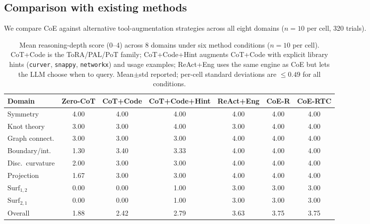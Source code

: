 \documentclass{article}
\begin{document}
\enlargethispage{14\baselineskip}
\subsection{Comparison with existing methods}
\label{sec:comparison}
We compare CoE against alternative tool-augmentation strategies across all
eight domains ($n{=}10$ per cell, 320 trials).

\begin{table}[t]
\centering
\caption{Mean reasoning-depth score (0--4) across 8 domains under six method
conditions ($n{=}10$ per cell). CoT+Code is the ToRA/PAL/PoT family;
CoT+Code+Hint augments CoT+Code with explicit library hints
(\texttt{curver}, \texttt{snappy}, \texttt{networkx}) and usage examples;
ReAct+Eng uses the same engine as CoE but lets the LLM choose when to query.
Mean$\pm$std reported; per-cell standard deviations are $\le 0.49$ for all conditions.}
\label{tab:methods}
\scriptsize
\setlength{\tabcolsep}{3pt}
\begin{tabular}{lcccccc}
\toprule
Domain & Zero-CoT & CoT+Code & CoT+Code+Hint & ReAct+Eng & CoE-R & CoE-RTC \\
\midrule
Symmetry              & 4.00 & 4.00 & 4.00 & 4.00 & 4.00 & 4.00 \\
Knot theory           & 3.00 & 3.00 & 4.00 & 3.00 & 4.00 & 4.00 \\
Graph connect.        & 3.00 & 3.00 & 3.00 & 4.00 & 4.00 & 4.00 \\
Boundary/int.         & 1.30 & 3.40 & 3.33 & 4.00 & 4.00 & 4.00 \\
Disc.\ curvature      & 2.00 & 3.00 & 3.00 & 4.00 & 4.00 & 4.00 \\
Projection            & 1.67 & 3.00 & 3.00 & 4.00 & 4.00 & 4.00 \\
$\mathrm{Surf}_{1,2}$ & 0.00 & 0.00 & 1.00 & 3.00 & 3.00 & 3.00 \\
$\mathrm{Surf}_{2,1}$ & 0.00 & 0.00 & 1.00 & 3.00 & 3.00 & 3.00 \\
\midrule
Overall               & 1.88 & 2.42 & 2.79 & 3.63 & 3.75 & 3.75 \\
\bottomrule
\end{tabular}
\end{table}
\end{document}
